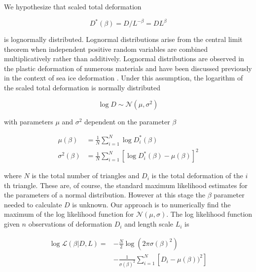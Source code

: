 \documentclass[aog]{igs}
\begin{document}
We hypothesize that scaled total deformation 
\begin{linenomath*}
\begin{equation}
    D^*(\beta) = D/L^{-\beta} = DL^\beta
\end{equation}
\end{linenomath*}
is lognormally distributed.
Lognormal distributions arise from the central limit theorem when independent positive random variables are combined multiplicatively rather than additively. Lognormal distributions are observed in the plastic deformation of numerous materials \citep{tang2020_LognormalDistributiona, chen2021_WhyLocal} and have been discussed previously in the context of sea ice deformation \citep{Marsan2004}.
Under this assumption, the logarithm of the scaled total deformation is normally distributed 
\begin{linenomath*}
\begin{equation}
    \log D \sim \mathcal N(\mu, \sigma^2) \label{eqn:scaled_ln}
\end{equation}
\end{linenomath*}
with parameters $\mu$ and $\sigma^2$ dependent on the parameter $\beta$
\begin{linenomath*}
\begin{align}
\mu(\beta) &= \frac 1N \sum_{i=1}^N \log D_i^*(\beta) \label{eqn:mu}\\
\sigma^2(\beta) &= \frac 1N \sum_{i=1}^N \left[\log D_i^*(\beta) - \mu(\beta)\right]^2 \label{eqn:sig}
\end{align}
\end{linenomath*}
where $N$ is the total number of triangles and $D_i$ is the total deformation of the $i$th triangle. These are, of course, the standard maximum likelihood estimates for the parameters of a normal distribution. However at this stage the $\beta$ parameter needed to calculate $D$ is unknown. Our approach is to numerically find the maximum of the log likelihood function for $\mathcal N(\mu, \sigma)$.
The log likelihood function given $n$ observations of deformation $D_i$ and length scale $L_i$ is 
\begin{linenomath*}
\begin{align}
    \log \mathcal{L}(\beta | D, L)  = &  -\frac N2 \log (2\pi \sigma(\beta)^2 )   \nonumber \\ 
    & - \frac{1}{\sigma(\beta)^2}\sum_{i=1}^N \left[D_i - \mu(\beta))^2\right] 
\end{align}
\end{linenomath*}
\end{document}
